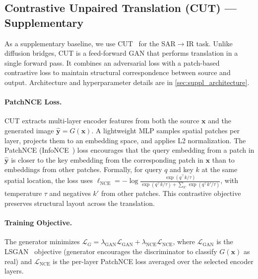 \subsection{Contrastive Unpaired Translation (CUT) — Supplementary}
\label{sec:cut_formalism}

As a supplementary baseline, we use CUT~\cite{parkContrastiveLearningUnpaired2020} for the SAR$\rightarrow$IR task. Unlike diffusion bridges, CUT is a feed-forward GAN that performs translation in a single forward pass. It combines an adversarial loss with a patch-based contrastive loss to maintain structural correspondence between source and output. Architecture and hyperparameter details are in \cref{sec:suppl_architecture}.

\paragraph{PatchNCE Loss.}
CUT extracts multi-layer encoder features from both the source $\bm{x}$ and the generated image $\hat{\bm{y}} = G(\bm{x})$. A lightweight MLP samples spatial patches per layer, projects them to an embedding space, and applies L2 normalization. The PatchNCE (InfoNCE~\cite{oordRepresentationLearningContrastive2019}) loss encourages that the query embedding from a patch in $\hat{\bm{y}}$ is closer to the key embedding from the corresponding patch in $\bm{x}$ than to embeddings from other patches. Formally, for query $q$ and key $k$ at the same spatial location, the loss uses $\ell_{\text{NCE}} = -\log \frac{\exp(q^\top k / \tau)}{\exp(q^\top k / \tau) + \sum_{k'} \exp(q^\top k' / \tau)}$, with temperature $\tau$ and negatives $k'$ from other patches. This contrastive objective preserves structural layout across the translation.

\paragraph{Training Objective.}
The generator minimizes $\mathcal{L}_G = \lambda_{\text{GAN}} \mathcal{L}_{\text{GAN}} + \lambda_{\text{NCE}} \mathcal{L}_{\text{NCE}}$, where $\mathcal{L}_{\text{GAN}}$ is the LSGAN~\cite{maoLeastSquaresGenerative2017} objective (generator encourages the discriminator to classify $G(\bm{x})$ as real) and $\mathcal{L}_{\text{NCE}}$ is the per-layer PatchNCE loss averaged over the selected encoder layers.
